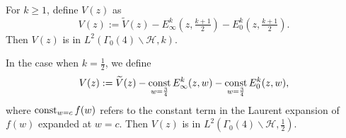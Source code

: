 \begin{proposition}
  For $k \geq 1$, define $V(z)$ as
  \begin{equation}
    V(z) := \widetilde{V}(z) - E_\infty^k(z, \tfrac{k+1}{2}) - E_0^k(z, \tfrac{k+1}{2}).
  \end{equation}
  Then $V(z)$ is in $L^2(\Gamma_0(4)\backslash \mathcal{H}, k)$.

  In the case when $k = \frac{1}{2}$, we define
  \begin{equation}
    V(z) := \widetilde{V}(z) - \operatorname*{const}_{w = \frac{3}{4}} E_\infty^k(z, w) - \operatorname*{const}_{w =
    \frac{3}{4}} E_0^k(z,w),
  \end{equation}
  where $\operatorname*{const}_{w=c} f(w)$ refers to the constant term in the Laurent expansion of $f(w)$
  expanded at $w=c$.
  Then $V(z)$ is in $L^2(\Gamma_0(4)\backslash \mathcal{H}, \frac{1}{2})$.
\end{proposition}




